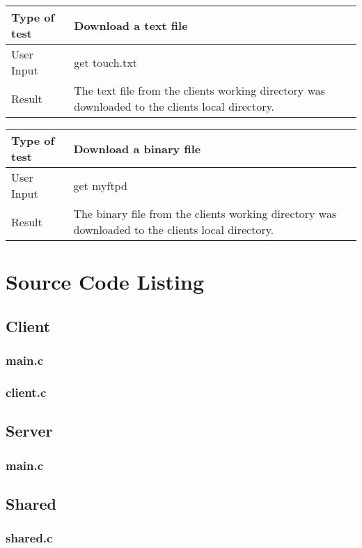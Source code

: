 \documentclass{article}
\begin{document}
    \newline
    \begin{tabulary}{1.0\textwidth}{|L|L|}
    \hline Type of test & Download a text file\\
    \hline User Input & get touch.txt\\
    \hline Result & The text file from the clients working directory was downloaded to the clients local directory.\\
    \hline
    \end{tabulary}
    \newline
    \begin{tabulary}{1.0\textwidth}{|L|L|}
    \hline Type of test & Download a binary file\\
    \hline User Input & get myftpd\\
    \hline Result & The binary file from the clients working directory was downloaded to the clients local directory. \\
    \hline
    \end{tabulary}

\newpage
\section{Source Code Listing}
\subsection{Client}
    \subsubsection{main.c}
	
	\subsubsection{client.c}
	
\subsection{Server}
    \subsubsection{main.c}
	
\subsection{Shared}
    \subsubsection{shared.c}
	
\end{document}
